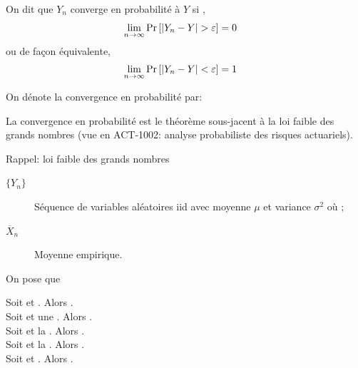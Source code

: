 \documentclass[10pt, french]{article}
\begin{document}
\begin{multicols*}{2}
\begin{definitionNOHFILL}
On dit que $Y_{n}$ converge en probabilité à $Y$ si , 
\begin{align*}
	\underset{n \rightarrow \infty}{\lim} \Pr\left[|Y_{n}	-	Y|	>	\varepsilon\right]	
	&=	0
\end{align*}
ou de façon équivalente,
\begin{align*}
	\underset{n \rightarrow \infty}{\lim} \Pr\left[|Y_{n}	-	Y|<	\varepsilon\right]	
	&=	1
\end{align*}

On dénote la convergence en probabilité par: 
\end{definitionNOHFILL}

La convergence en probabilité est le théorème sous-jacent à la loi faible des grands nombres (vue en ACT-1002: analyse probabiliste des risques actuariels).

\begin{rappel}{Rappel: loi faible des grands nombres}
\begin{distributions}[Notation]
\begin{description}
	\item[$\{Y_{n}\}$]	Séquence de variables aléatoires iid avec moyenne $\mu$ et variance $\sigma^{2}$ où ;
	\item[$\overline{X}_{n}$]	Moyenne empirique.
\end{description}
\end{distributions}

On pose que 
\end{rappel}

\begin{definitionNOHFILLprop}
Soit  et . Alors .\\
Soit  et une . Alors .\\
Soit  et la . Alors .\\
Soit  et la . Alors .\\
Soit  et . Alors .
\end{definitionNOHFILLprop}



\end{multicols*}
\end{document}
